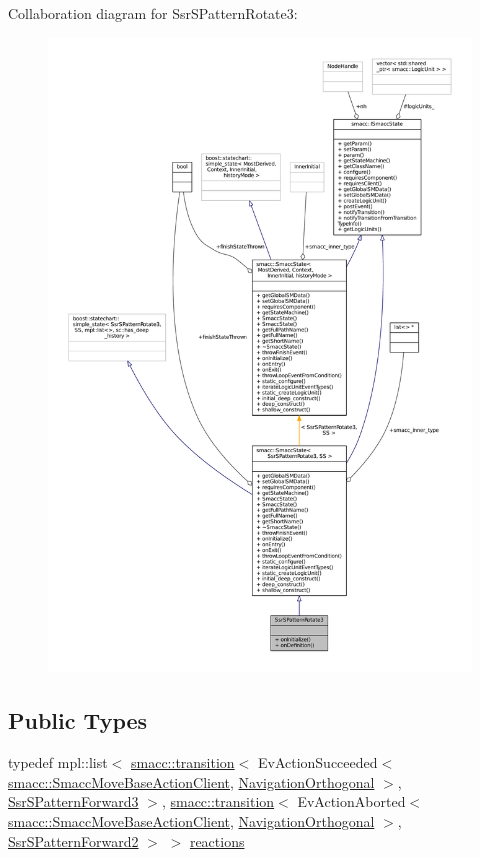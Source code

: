 Collaboration diagram for Ssr\+S\+Pattern\+Rotate3\+:
\nopagebreak
\begin{figure}[H]
\begin{center}
\leavevmode
\includegraphics[width=350pt]{structSsrSPatternRotate3__coll__graph}
\end{center}
\end{figure}
\subsection*{Public Types}
\begin{DoxyCompactItemize}
\item 
typedef mpl\+::list$<$ \hyperlink{classsmacc_1_1transition}{smacc\+::transition}$<$ Ev\+Action\+Succeeded$<$ \hyperlink{classsmacc_1_1SmaccMoveBaseActionClient}{smacc\+::\+Smacc\+Move\+Base\+Action\+Client}, \hyperlink{classNavigationOrthogonal}{Navigation\+Orthogonal} $>$, \hyperlink{structSsrSPatternForward3}{Ssr\+S\+Pattern\+Forward3} $>$, \hyperlink{classsmacc_1_1transition}{smacc\+::transition}$<$ Ev\+Action\+Aborted$<$ \hyperlink{classsmacc_1_1SmaccMoveBaseActionClient}{smacc\+::\+Smacc\+Move\+Base\+Action\+Client}, \hyperlink{classNavigationOrthogonal}{Navigation\+Orthogonal} $>$, \hyperlink{structSsrSPatternForward2}{Ssr\+S\+Pattern\+Forward2} $>$ $>$ \hyperlink{structSsrSPatternRotate3_a3e6c9cdc8f767af817ffad1adc653888}{reactions}
\end{DoxyCompactItemize}
